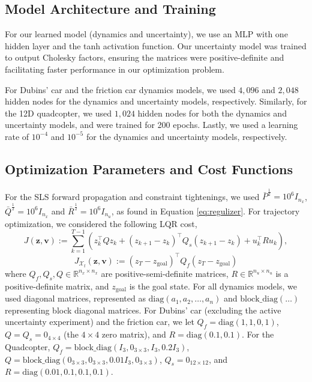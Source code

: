 \documentclass{l4dc2026}
\newcommand{\Z}{\mathbf{z}}
\newcommand{\V}{\mathbf{v}}
\newcommand{\T}{^\top}
\begin{document}
\subsection{Model Architecture and Training}
For our learned model (dynamics and uncertainty), we use an MLP with one hidden layer and the tanh activation function. Our uncertainty model was trained to output Cholesky factors, ensuring the matrices were positive-definite and facilitating faster performance in our optimization problem. 

For Dubins' car and the friction car dynamics models, we used $4,096$ and $2,048$ hidden nodes for the dynamics and uncertainty models, respectively.  
Similarly, for the 12D quadcopter, we used $1,024$ hidden nodes for both the dynamics and uncertainty models, and were trained for 200 epochs. Lastly, we used a learning rate of $10^{-4}$ and $10^{-5}$ for the dynamics and uncertainty models, respectively.

\subsection{Optimization Parameters and Cost Functions}\label{app:lqr_app}
For the SLS forward propagation and constraint tightenings, we used $\bar{P}^{\frac{1}{2}} = 10^6I_{n_x}$, $\bar{Q}^{\frac{1}{2}} = 10^6I_{n_x}$ and $\bar{R}^{\frac{1}{2}} = 10^6I_{n_u}$, as found in Equation \ref{eq:regulizer}. For trajectory optimization, we considered the following LQR cost, 
\begin{equation}\label{eq:lqr}
J(\Z,\V) :=  
      \sum_{k=1}^{T-1} \left( z_k\T Q  z_k + (z_{k+1} - z_k)\T Q_{s}  (z_{k+1} - z_k) + u_k\T R {u}_k \right),
\end{equation}
\begin{equation}\label{eq:lqr_terminal}
    J_{\mathcal{X}_\textrm{f}}(\Z,\V) := (z_T - z_\text{goal})\T Q_f (z_T - z_\text{goal})
\end{equation}
where $Q_f, Q_s, Q \in \mathbb{R}^{n_x \times n_x}$ are positive-semi-definite matrices, $R\in\mathbb{R}^{n_u \times n_u}$ is a positive-definite matrix, and $z_\text{goal}$ is the goal state. For all dynamics models, we used diagonal matrices, represented as $\text{diag}(a_1,a_2, \dots, a_n)$ and $\text{block\_diag}(\dots)$ representing block diagonal matrices. For Dubins' car (excluding the active uncertainty experiment) and the friction car, we let $Q_f = \text{diag}(1,1,0,1)$, $Q = Q_s = 0_{4 \times 4}$ (the $4 \times 4$ zero matrix), and $R = \text{diag}(0.1, 0.1)$. For the Quadcopter, $Q_f = \text{block\_diag}(I_3, 0_{3\times3}, I_3, 0.2I_3)$, $Q = \text{block\_diag}(0_{3\times3}, 0_{3\times3}, 0.01I_3,0_{3\times3})$, $Q_s = 0_{12\times12}$, and $R = \text{diag}(0.01, 0.1, 0.1, 0.1)$. 
\end{document}
